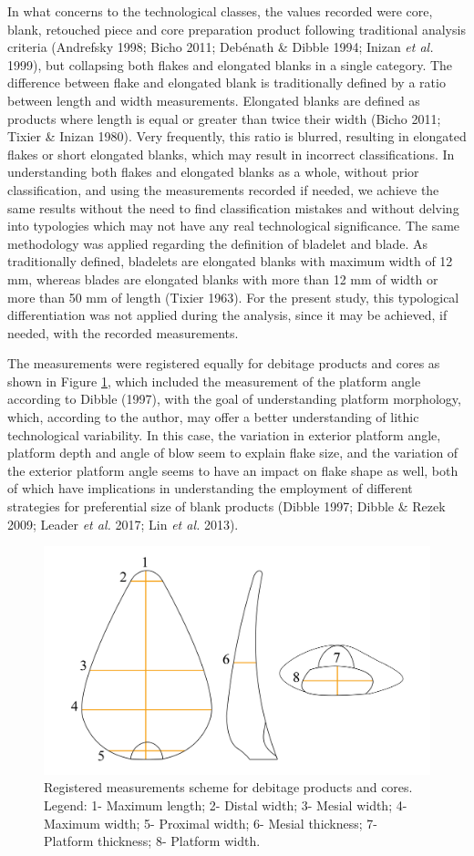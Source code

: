 \documentclass[12pt,twoside]{reedthesis}
\begin{document}
In what concerns to the technological classes, the values recorded were core, blank, retouched piece and core preparation product following traditional analysis criteria (Andrefsky 1998; Bicho 2011; Debénath \& Dibble 1994; Inizan \emph{et al.} 1999), but collapsing both flakes and elongated blanks in a single category. The difference between flake and elongated blank is traditionally defined by a ratio between length and width measurements. Elongated blanks are defined as products where length is equal or greater than twice their width (Bicho 2011; Tixier \& Inizan 1980). Very frequently, this ratio is blurred, resulting in elongated flakes or short elongated blanks, which may result in incorrect classifications. In understanding both flakes and elongated blanks as a whole, without prior classification, and using the measurements recorded if needed, we achieve the same results without the need to find classification mistakes and without delving into typologies which may not have any real technological significance. The same methodology was applied regarding the definition of bladelet and blade. As traditionally defined, bladelets are elongated blanks with maximum width of 12 mm, whereas blades are elongated blanks with more than 12 mm of width or more than 50 mm of length (Tixier 1963). For the present study, this typological differentiation was not applied during the analysis, since it may be achieved, if needed, with the recorded measurements.

The measurements were registered equally for debitage products and cores as shown in Figure \ref{fig:metric}, which included the measurement of the platform angle according to Dibble (1997), with the goal of understanding platform morphology, which, according to the author, may offer a better understanding of lithic technological variability. In this case, the variation in exterior platform angle, platform depth and angle of blow seem to explain flake size, and the variation of the exterior platform angle seems to have an impact on flake shape as well, both of which have implications in understanding the employment of different strategies for preferential size of blank products (Dibble 1997; Dibble \& Rezek 2009; Leader \emph{et al.} 2017; Lin \emph{et al.} 2013).
\begin{figure}

{\centering \includegraphics[width=0.6\linewidth]{figure/Metrics-01} 

}

\caption{Registered measurements scheme for debitage products and cores. Legend: 1- Maximum length; 2- Distal width; 3- Mesial width; 4- Maximum width; 5- Proximal width; 6- Mesial thickness; 7- Platform thickness; 8- Platform width.}\label{fig:metric}
\end{figure}
~
\end{document}
